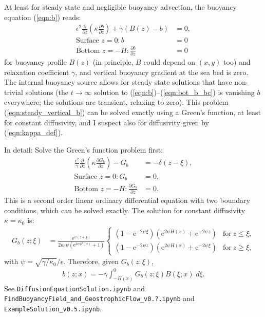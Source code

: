 \documentclass[10pt]{amsart}
\begin{document}
At least for steady state and negligible buoyancy advection, the buoyancy equation (\ref{eqn:b}) reads:
\begin{align}
\epsilon^2 \frac{\partial }{\partial z} \left( \kappa \frac{\partial b}{\partial z} \right) + \gamma \left(  B(z) - b \right) & = 0, \label{eqn:steady_vertical_b} \\
\text{Surface~}z = 0:
b &= 0
 \\
\text{Bottom~}z = -H:
\frac{\partial b}{\partial z} &= 0
\end{align}
for buoyancy profile $B(z)$ (in principle, $B$ could depend on $(x,y)$ too) and relaxation coefficient $\gamma$, and vertical buoyancy gradient at the sea bed is zero. 
The internal buoyancy source allows for steady-state solutions that have non-trivial solutions (the $t\rightarrow \infty$ solution to (\ref{eqn:b})--(\ref{eqn:bot_b_bc}) is vanishing $b$ everywhere; the \citealt{peterson&callies26} solutions are transient, relaxing to zero).
This problem (\ref{eqn:steady_vertical_b}) can be solved exactly using a Green's function, at least for constant diffusivity, and I suspect also for diffusivity given by (\ref{eqn:kappa_def}). 

In detail: Solve the Green's function problem first:
\begin{align}
\frac{\epsilon^2}{\gamma} \frac{\partial }{\partial z} \left( \kappa \frac{\partial G_b}{\partial z} \right) -  G_b & =  -  \delta(z - \xi) , \label{eqn:Gsfn}\\
\text{Surface~}z = 0:
G_b &= 0 ,
\label{eqn:Gsfn_sfcbc} \\
\text{Bottom~}z = -H:
\frac{\partial G_b}{\partial z} &= 0 .
\label{eqn:Gsfn_botbc}
\end{align}
This is a second order linear ordinary differential equation with two boundary conditions, which can be solved exactly.
The solution for constant diffusivity $\kappa = \kappa_0$ is:
\begin{align}
G_b (z; \xi) & = \frac{\mathrm{e}^{\psi \left(z + \xi\right)}}
{2  \kappa_0 \psi \left(\mathrm{e}^{2 \psi H \left(x \right)} + 1\right)}
\begin{cases} 
\displaystyle \left(1 - \mathrm{e}^{- 2 \psi \xi} \right) \left(\mathrm{e}^{2 \psi H{\left(x \right)}} + \mathrm{e}^{- 2 \psi z  }\right) & \text{for}\: z \leq \xi , \\
\displaystyle \left(1 - \mathrm{e}^{- 2 \psi   z} \right) \left(\mathrm{e}^{2 \psi H{\left(x \right)}} + \mathrm{e}^{- 2 \psi \xi}\right) & \text{for}\: z \geq \xi ,
\end{cases}
\end{align}
with $\psi = \sqrt{\gamma/\kappa_0} / \epsilon$.
Therefore, given $G_b(z; \xi)$,
\begin{align}
b(z; x) = - \gamma \int_{-H(x)}^{0} G_b(z; \xi) B(\xi; x) \; d \xi  .
\label{eqn:b_solution}
\end{align}
See \texttt{DiffusionEquationSolution.ipynb} and \texttt{FindBuoyancyField\_and\_GeostrophicFlow\_v0.?.ipynb} and \texttt{ExampleSolution\_v0.5.ipynb}.
\end{document}
